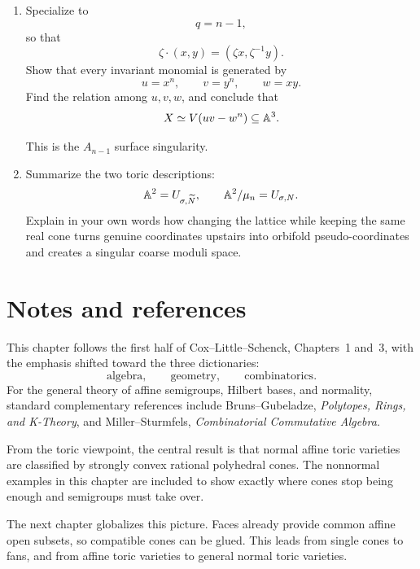 \begin{enumerate}[label=\textbf{Hint \arabic*.},wide=0pt]
Contrast this with the smooth orbifold
\[
[\AAA^2/\mu_n].
\]
The same real cone is smooth in the lattice \(\widetilde N\), but not
in the larger lattice \(N\).

\item Specialize to
\[
q=n-1,
\]
so that
\[
\zeta\cdot(x,y)=(\zeta x,\zeta^{-1}y).
\]
Show that every invariant monomial is generated by
\[
u=x^n,
\qquad
v=y^n,
\qquad
w=xy.
\]
Find the relation among \(u,v,w\), and conclude that
\[
X
\simeq
V(uv-w^n)\subseteq\mathbb{A}^3.
\]

This is the \(A_{n-1}\) surface singularity.

\item Summarize the two toric descriptions:
\[
\mathbb{A}^2=U_{\sigma,\widetilde N},
\qquad
\mathbb{A}^2/\mu_n=U_{\sigma,N}.
\]
Explain in your own words how changing the lattice while keeping the
same real cone turns genuine coordinates upstairs into orbifold
pseudo-coordinates and creates a singular coarse moduli space.
\end{enumerate}


\clearpage

\section*{Notes and references}

This chapter follows the first half of Cox--Little--Schenck,
Chapters~1 and~3, with the emphasis shifted toward the three
dictionaries:
\[
\text{algebra},\qquad
\text{geometry},\qquad
\text{combinatorics}.
\]
For the general theory of affine semigroups, Hilbert bases, and
normality, standard complementary references include Bruns--Gubeladze,
\emph{Polytopes, Rings, and K-Theory}, and Miller--Sturmfels,
\emph{Combinatorial Commutative Algebra}.

From the toric viewpoint, the central result is that normal affine
toric varieties are classified by strongly convex rational polyhedral
cones. The nonnormal examples in this chapter are included to show
exactly where cones stop being enough and semigroups must take over.

The next chapter globalizes this picture. Faces already provide common
affine open subsets, so compatible cones can be glued. This leads from
single cones to fans, and from affine toric varieties to general
normal toric varieties.
